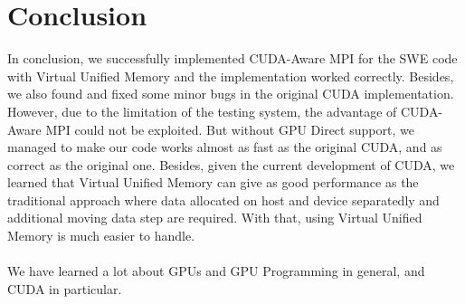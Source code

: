 \documentclass[article]{scrartcl}
\begin{document}
\section{Conclusion}
In conclusion, we successfully implemented CUDA-Aware MPI for the SWE code with Virtual Unified Memory and the implementation worked correctly. Besides, we also found and fixed some minor bugs in the original CUDA implementation. However, due to the limitation of the testing system, the advantage of CUDA-Aware MPI could not be exploited. But without GPU Direct support, we managed to make our code works almost as fast as the original CUDA, and as correct as the original one. Besides, given the current development of CUDA, we learned that Virtual Unified Memory can give as good performance as the traditional approach where data allocated on host and device separatedly and additional moving data step are required. With that, using Virtual Unified Memory is much easier to handle.
\\
\\
We have learned a lot about GPUs and GPU Programming in general, and CUDA in particular.    


\medskip
{}

\end{document}
